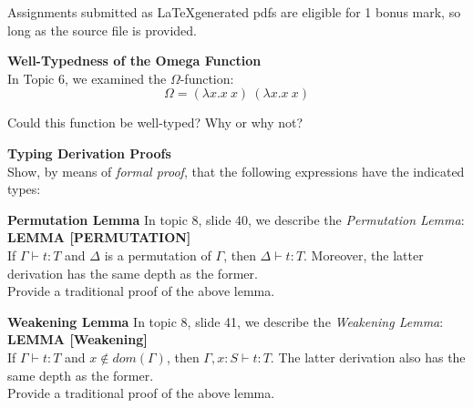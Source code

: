 \documentclass{exam}
\let\OldTexttt\texttt
\renewcommand{\texttt}[1]{\OldTexttt{\color{teal}{#1}}}
\begin{document}
\begin{center}
\end{center}

Assignments submitted as \LaTeX generated pdfs are eligible for 1 bonus mark, so long as the source file is provided.  

\begin{questions}
\question[4] \textbf{Well-Typedness of the Omega Function} \\ 
In Topic 6, we examined the $\Omega$-function:
\begin{equation}
\Omega = (\lambda x.x\:x)\:(\lambda x.x\:x)
\end{equation}

Could this function be well-typed?  Why or why not? 

\question \textbf{Typing Derivation Proofs} \\
Show, by means of \emph{formal proof}, that the following expressions have the indicated types:


\question[4] \textbf{Permutation Lemma}
In topic 8, slide 40, we describe the \emph{Permutation Lemma}: \\

\textbf{LEMMA [PERMUTATION]} \\
If $\Gamma \vdash t : T$ and $\Delta$ is a permutation of $\Gamma$, then $\Delta \vdash t : T$.  Moreover, the latter derivation has the same depth as the former.  \\

Provide a traditional proof of the above lemma.

\question[4] \textbf{Weakening Lemma}
In topic 8, slide 41, we describe the \emph{Weakening Lemma}: \\

\textbf{LEMMA [Weakening]} \\
If $\Gamma \vdash t : T$ and $x \notin dom(\Gamma)$, then $\Gamma, x : S \vdash t : T$.  The latter derivation also has the same depth as the former. \\

Provide a traditional proof of the above lemma. 


\end{questions}
\end{document}
